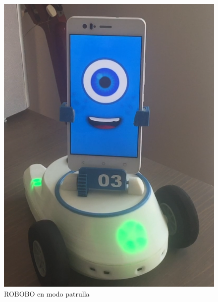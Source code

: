 \begin{figure}
\begin{minipage}{0.45\textwidth}
\end{minipage}\hfill
\begin{minipage}{0.45\textwidth}
\centering
\includegraphics[width=1\linewidth]{imagenes/vigilante_patrol.png}

\caption{ROBOBO en modo patrulla}
\label{fig:vigilante-patrol}

\end{minipage}
\end{figure}


